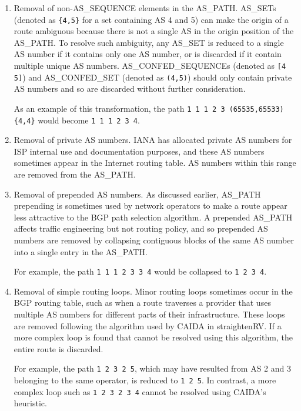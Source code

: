 \begin{enumerate}
\item{Removal of non-AS\_SEQUENCE elements in the AS\_PATH. AS\_SETs (denoted as \verb!{4,5}! for a set containing AS 4 and 5) can make the origin of a route ambiguous because there is not a single AS in the origin position of the AS\_PATH. To resolve such ambiguity, any AS\_SET is reduced to a single AS number if it contains only one AS number, or is discarded if it contain multiple unique AS numbers. AS\_CONFED\_SEQUENCEs (denoted as \verb![4 5]!) and AS\_CONFED\_SET (denoted as \verb!(4,5)!) should only contain private AS numbers and so are discarded without further consideration.

As an example of this transformation, the path \verb!1 1 1 2 3 (65535,65533) {4,4}! would become \verb!1 1 1 2 3 4!.
}

\item{Removal of private AS numbers. IANA has allocated private AS numbers \cite{rfc1930,rfc5398} for ISP internal use and documentation purposes, and these AS numbers sometimes appear in the Internet routing table. AS numbers within this range are removed from the AS\_PATH.}

\item{Removal of prepended AS numbers. As discussed earlier, AS\_PATH prepending is sometimes used by network operators to make a route appear less attractive to the BGP path selection algorithm. A prepended AS\_PATH affects traffic engineering but not routing policy, and so prepended AS numbers are removed by collapsing contiguous blocks of the same AS number into a single entry in the AS\_PATH.

For example, the path \verb!1 1 1 2 3 3 4! would be collapsed to \verb!1 2 3 4!.}
\item{Removal of simple routing loops. Minor routing loops sometimes occur in the BGP routing table, such as when a route traverses a provider that uses multiple AS numbers for different parts of their infrastructure. These loops are removed following the algorithm used by CAIDA in straightenRV\cite{straightenrv}. If a more complex loop is found that cannot be resolved using this algorithm, the entire route is discarded.

For example, the path \verb!1 2 3 2 5!, which may have resulted from AS 2 and 3 belonging to the same operator, is reduced to \verb!1 2 5!. In contrast, a more complex loop such as \verb!1 2 3 2 3 4! cannot be resolved using CAIDA's heuristic.}
\end{enumerate}

